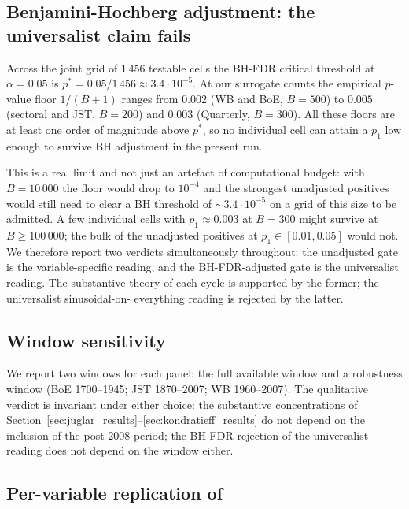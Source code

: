 \subsection{Benjamini-Hochberg adjustment: the universalist claim fails}

Across the joint grid of 1\,456 testable cells the BH-FDR
critical threshold at \(\alpha=0.05\) is
\(p^* = 0.05 / 1\,456 \approx 3.4\cdot 10^{-5}\). At our
surrogate counts the empirical \(p\)-value floor
\(1/(B+1)\) ranges from \(0.002\) (WB and BoE, \(B=500\)) to
\(0.005\) (sectoral and JST, \(B=200\)) and \(0.003\)
(Quarterly, \(B=300\)). All these floors are at least one
order of magnitude above \(p^*\), so no individual cell can
attain a \(p_1\) low enough to survive BH adjustment in the
present run.

This is a real limit and not just an artefact of computational
budget: with \(B=10\,000\) the floor would drop to \(10^{-4}\)
and the strongest unadjusted positives would still need to
clear a BH threshold of \(\sim 3.4\cdot 10^{-5}\) on a grid of
this size to be admitted. A few individual cells with
\(p_1\approx 0.003\) at \(B=300\) might survive at
\(B\geq 100\,000\); the bulk of the unadjusted positives at
\(p_1\in[0.01, 0.05]\) would not. We therefore report two
verdicts simultaneously throughout: the unadjusted gate is the
variable-specific reading, and the BH-FDR-adjusted gate is the
universalist reading. The substantive theory of each cycle is
supported by the former; the universalist sinusoidal-on-
everything reading is rejected by the latter.

\subsection{Window sensitivity}

We report two windows for each panel: the full available window
and a robustness window (BoE 1700--1945; JST 1870--2007;
WB 1960--2007). The qualitative verdict is invariant under
either choice: the substantive concentrations of
Section~\ref{sec:juglar_results}--\ref{sec:kondratieff_results}
do not depend on the inclusion of the post-2008 period; the
BH-FDR rejection of the universalist reading does not depend
on the window either.

\subsection{Per-variable replication of \citet{wen2005}}
\label{sec:wen_replication}

